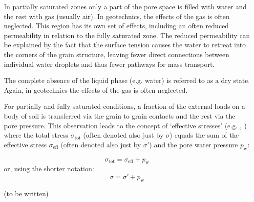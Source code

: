 In partially saturated zones only a part of the pore space is filled with water
and the rest with gas (usually air). In geotechnics, the effects of the gas is
often neglected. This region has its own set of effects, including an often
reduced permeability in relation to the fully saturated zone. The reduced
permeability can be explained by the fact that the surface tension causes the
water to retreat into the corners of the grain structure, leaving fewer direct
connections between individual water droplets and thus fewer pathways for mass
transport.

The complete absence of the liquid phase (e.g. water) is referred to as a dry
state. Again, in geotechnics the effects of the gas is often neglected.

For partially and fully saturated conditions, a fraction of the external loads
on a body of soil is transferred via the grain to grain contacts and the rest
via the pore pressure. This observation leads to the concept of ‘effective
stresses’ (e.g. ,
) where the total stress
$\sigma_\mathrm{tot}$ (often denoted also just by $\sigma$) equals the sum of
the effective stress $\sigma_\mathrm{eff}$ (often denoted also just by
$\sigma'$) and the pore water pressure $p_\mathrm{w}$:

\begin{equation}
  \sigma_\mathrm{tot} = \sigma_\mathrm{eff} + p_\mathrm{w}
\end{equation}
or, using the shorter notation:
\begin{equation}
  \sigma = \sigma' + p_\mathrm{w}
\end{equation}

(to be written)

% 
% 
% 
% 
% 
